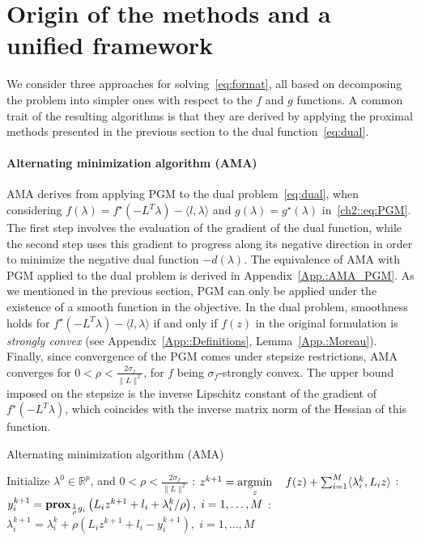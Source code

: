 \documentclass[openany]{now}
\newcommand{\reals}{{\mathbb R}}
\newcommand{\argmin}{\mathop{\rm argmin}}
\newcommand{\prox}{\mathop{\bf prox}}
\begin{document}
\section{Origin of the methods and a unified framework}\label{sec:history}
We consider three approaches for solving~\eqref{eq:format}, all based on decomposing the problem into simpler ones with respect to the $f$ and $g$ functions. A common trait of the resulting algorithms is that they are derived by applying the proximal methods presented in the previous section to the dual function~\eqref{eq:dual}.

  \paragraph{Alternating minimization algorithm (AMA)~\cite{ama}} AMA derives from applying PGM to the dual problem~\eqref{eq:dual}, when considering $f(\lambda)=f^\star(-L^T\lambda) - \langle  l,\lambda\rangle $ and $g(\lambda)=g^\star(\lambda)$ in~\eqref{ch2::eq:PGM}. The first step involves the evaluation of the gradient of the dual function, while the second step uses this gradient to progress along its negative direction in order to minimize the negative dual function $-d(\lambda)$. The equivalence of AMA with PGM applied to the dual problem is derived in Appendix~\ref{App.:AMA_PGM}. As we mentioned in the previous section, PGM can only be applied under the existence of a smooth function in the objective. In the dual problem, smoothness holds for $f^\star(-L^T\lambda) - \langle  l,\lambda\rangle $ if and only if $f(z)$ in the original formulation is \emph{strongly convex} (see Appendix~\ref{App::Definitions}, Lemma~\ref{App.:Moreau}). Finally, since convergence of the PGM comes under stepsize restrictions, AMA converges for $0 < \rho < \frac{2\sigma_f}{\|L\|^2}$, for $f$ being $\sigma_f$-strongly convex. The upper bound imposed on the stepsize is the inverse Lipschitz constant of the gradient of $f^\star(-L^T\lambda)$, which coincides with the inverse matrix norm of the Hessian of this function. 
  \begin{algorithm}[H]
  \caption{Alternating minimization algorithm (AMA)}
  \label{al:AMA}
  \begin{algorithmic} 
  \REQUIRE Initialize $\lambda^{0}\in \reals^{p}$, and $0 < \rho < \frac{2\sigma_f}{\|L\|^2}$
  \LOOP
  : $z^{k+1} = \argmin\limits_z \quad f(z) + \sum_{i=1}^M \langle  \lambda_i^k, L_i z\rangle $
  : $y_i^{k+1} = \prox_{\frac{1}{\rho}g_i}\left(L_iz^{k+1}+l_i+\lambda_i^k/\rho\right), \; i=1,\ldots,M$
  : $\lambda^{k+1}_i = \lambda_i^k + \rho(L_i z^{k+1} +l_i  - y_i^{k+1}),\; i=1,\ldots,M$
  \ENDLOOP
  \end{algorithmic}
  \end{algorithm}\begin{footnotesize}
  \end{footnotesize}
\end{document}

